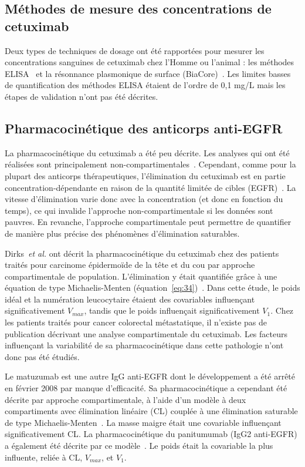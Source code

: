 \subsection{Méthodes de mesure des concentrations de cetuximab}
Deux types de techniques de dosage ont été rapportées pour mesurer les concentrations sanguines de cetuximab chez l'Homme ou l'animal : les méthodes ELISA~\citep{REF122, REF123, REF124} et la résonnance plasmonique de surface (BiaCore)~\citep{REF125}. Les limites basses de quantification des méthodes ELISA étaient de l'ordre de 0,1 mg/L mais les étapes de validation n'ont pas été décrites.

\subsection{Pharmacocinétique des anticorps anti-EGFR}
La pharmacocinétique du cetuximab a été peu décrite. Les analyses qui ont été réalisées sont principalement non-compartimentales~\citep{REF118, REF122, REF126}. Cependant, comme pour la plupart des anticorps thérapeutiques, l'élimination du cetuximab est en partie concentration-dépendante en raison de la quantité limitée de cibles (EGFR)~\citep{REF123, REF127, REF128}. La vitesse d'élimination varie donc avec la concentration (et donc en fonction du temps), ce qui invalide l'approche non-compartimentale si les données sont pauvres. En revanche, l'approche compartimentale peut permettre de quantifier de manière plus précise des phénomènes d'élimination saturables.

Dirks~\textit{et al.} ont décrit la pharmacocinétique du cetuximab chez des patients traités pour carcinome épidermoïde de la tête et du cou par approche compartimentale de population. L'élimination y était quantifiée grâce à une équation de type Michaelis-Menten (équation~\ref{eq:34})~\citep{REF68}. Dans cette étude, le poids idéal et la numération leucocytaire étaient des covariables influençant significativement $V_{max}$, tandis que le poids influençait significativement $V_1$. Chez les patients traités pour cancer colorectal métastatique, il n'existe pas de publication décrivant une analyse compartimentale du cetuximab. Les facteurs influençant la variabilité de sa pharmacocinétique dans cette pathologie n'ont donc pas été étudiés.

Le matuzumab est une autre IgG anti-EGFR dont le développement a été arrêté en février 2008 par manque d'efficacité. Sa pharmacocinétique a cependant été décrite par approche compartimentale, à l'aide d'un modèle à deux compartiments avec élimination linéaire (\gls{CL}) couplée à une élimination saturable de type Michaelis-Menten~\citep{REF72, REF129}. La masse maigre était une covariable influençant significativement \gls{CL}. La pharmacocinétique du panitumumab (IgG2 anti-EGFR) a également été décrite par ce modèle~\citep{REF73}. Le poids était la covariable la plus influente, reliée à \gls{CL}, $V_{max}$, et $V_1$.

